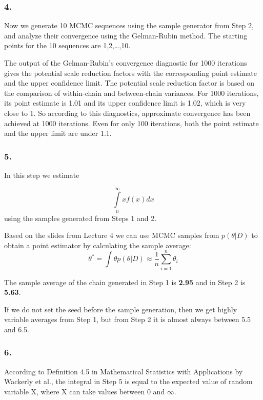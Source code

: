 \documentclass[]{article}
\begin{document}
\hypertarget{section-3}{%
\subsubsection{4.}\label{section-3}}

Now we generate 10 MCMC sequences using the sample generator from Step
2, and analyze their convergence using the Gelman-Rubin method. The
starting points for the 10 sequences are 1,2,\ldots{},10.

The output of the Gelman-Rubin's convergence diagnostic for 1000
iterations gives the potential scale reduction factors with the
corresponding point estimate and the upper confidence limit. The
potential scale reduction factor is based on the comparison of
within-chain and between-chain variances. For 1000 iterations, its point
estimate is 1.01 and its upper confidence limit is 1.02, which is very
close to 1. So according to this diagnostics, approximate convergence
has been achieved at 1000 iterations. Even for only 100 iterations, both
the point estimate and the upper limit are under 1.1.

\hypertarget{section-4}{%
\subsubsection{5.}\label{section-4}}

In this step we estimate

\[\int\limits_{0}^{\infty}xf(x)dx\] using the samples generated from
Steps 1 and 2.

Based on the slides from Lecture 4 we can use MCMC samples from
\(p(\theta|D)\) to obtain a point estimator by calculating the sample
average:
\[\theta^* = \int\theta p(\theta|D) \approx \frac{1}{n} \sum\limits_{i=1}^{n}\theta_i\]

The sample average of the chain generated in Step 1 is \textbf{2.95} and
in Step 2 is \textbf{5.63}.

If we do not set the seed before the sample generation, then we get
highly variable averages from Step 1, but from Step 2 it is almost
always between 5.5 and 6.5.

\hypertarget{section-5}{%
\subsubsection{6.}\label{section-5}}

According to Definition 4.5 in Mathematical Statistics with Applications
by Wackerly et al., the integral in Step 5 is equal to the expected
value of random variable X, where X can take values between 0 and
\(\infty\).
\end{document}
